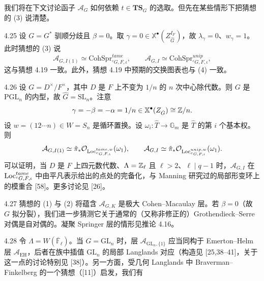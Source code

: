 我们将在下文讨论函子 $\mathcal{A}_G$ 如何依赖 $t\in\mathbf{TS}_G$ 的选取。但先在某些情形下把猜想的 (3) 说清楚。

\begin{exam}{4.25}
设 $G=G^*$ 驯顺分歧且 $\beta=0$。取 $\gamma=0\in\mathbb{X}^\bullet(Z_{\hat G}^{I_F})$，故 $\lambda_\gamma=0$、$w_\gamma=1$。此时猜想的 (3) 说
\[
\mathcal{A}_{G,I(1)}\simeq\mathrm{CohSpr}^{tame}_{{}^cG,F,\iota},\qquad
\mathcal{A}_{G,I}\simeq\mathrm{CohSpr}^{unip}_{{}^cG,F,\iota},
\]
这与猜想 4.19 一致。此外，猜想 4.19 中预期的交换图表也与 (4) 一致。
\end{exam}

\begin{exam}{4.26}
设 $G=D^\times/F^\times$，其中 $D$ 是 $F$ 上不变为 $1/n$ 的 $n$ 次中心除代数。则 $G$ 是 $\mathrm{PGL}_n$ 的内型，故 $\hat G=\mathrm{SL}_n$。注意
\[
\gamma=-\beta=-\alpha=1/n\in\mathbb{X}^\bullet(Z_{\hat G})\cong\mathbb{Z}/n.
\]
设 $w=(12\cdots n)\in W=S_n$ 是循环置换。设 $\omega_i:\hat T\to\mathbb{G}_m$ 是 $\hat T$ 的第 $i$ 个基本权。则
\[
\mathcal{A}_{G,I(1)}\simeq\tilde\pi_*\mathcal{O}_{\operatorname{Loc}^{tame,w}_{{}^cG,F,\iota}}(\omega_1),\qquad
\mathcal{A}_{G,I}\simeq\tilde\pi_*\mathcal{O}_{\operatorname{Loc}^{unip,w}_{{}^cG,F,\iota}}(\omega_1).
\]
可以证明，当 $D$ 是 $F$ 上四元数代数、$\Lambda=\mathbb{Z}_\ell$ 且 $\ell>2$、$\ell\mid q-1$ 时，$\mathcal{A}_{G,I}$ 在 $\operatorname{Loc}^{tame}_{{}^cG,F,\iota}$ 中由平凡表示给出的点处的完备化，与 Manning 研究过的局部形变环上的模重合 [58]。更多讨论见 [26]。
\end{exam}

\begin{rem}{4.27}
猜想的 (1) 与 (2) 将蕴含 $\mathcal{A}_{G,K}$ 是极大 Cohen–Macaulay 层。若 $\beta=0$（故 $G$ 拟分裂），我们进一步猜测它关于通常的（又称非修正的）Grothendieck–Serre 对偶是自对偶的。凝聚 Springer 层的情形见推论 4.16。
\end{rem}

\begin{rem}{4.28}
令 $\Lambda=W(\overline{\mathbb{F}}_\ell)$。当 $G=\mathrm{GL}_n$ 时，层 $\mathcal{A}_{\mathrm{GL}_n,\{1\}}$ 应当同构于 Emerton–Helm 层 $\mathcal{A}_{\mathrm{EH}}$，后者在族中插值 $\mathrm{GL}_n$ 的局部 Langlands 对应（构造见 [25,38–41]，关于这一点的讨论特别见 [38]）。另一方面，受几何 Langlands 中 Braverman–Finkelberg 的一个猜想（[11]）启发，我们有
\end{rem}
